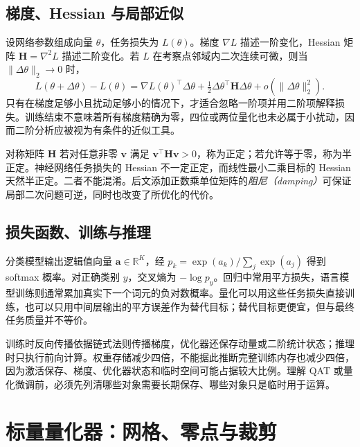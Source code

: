 \documentclass[UTF8,12pt,a4paper,fontset=fandol]{ctexart}
\begin{document}
\subsection{梯度、Hessian 与局部近似}
设网络参数组成向量 $\theta$，任务损失为 $L(\theta)$。梯度 $\nabla L$ 描述一阶变化，Hessian 矩阵 $\mathbf H=\nabla^2L$ 描述二阶变化。若 $L$ 在考察点邻域内二次连续可微，则当 $\|\Delta\theta\|_2\to0$ 时，
\begin{equation}
 L(\theta+\Delta\theta)-L(\theta)
 =\nabla L(\theta)^\top\Delta\theta
 +\tfrac12\Delta\theta^\top\mathbf H\Delta\theta
 +o(\|\Delta\theta\|_2^2).
 \label{eq:quant-taylor}
\end{equation}
只有在梯度足够小且扰动足够小的情况下，才适合忽略一阶项并用二阶项解释损失。训练结束不意味着所有梯度精确为零，四位或两位量化也未必属于小扰动，因而二阶分析应被视为有条件的近似工具。

对称矩阵 $\mathbf H$ 若对任意非零 $\mathbf v$ 满足 $\mathbf v^\top\mathbf H\mathbf v>0$，称为正定；若允许等于零，称为半正定。神经网络任务损失的 Hessian 不一定正定，而线性最小二乘目标的 Hessian 天然半正定。二者不能混淆。后文添加正数乘单位矩阵的\emph{阻尼（damping）}可保证局部二次问题可逆，同时也改变了所优化的代价。

\subsection{损失函数、训练与推理}
分类模型输出逻辑值向量 $\mathbf a\in\mathbb R^K$，经 $p_k=\exp(a_k)/\sum_j\exp(a_j)$ 得到 softmax 概率。对正确类别 $y$，交叉熵为 $-\log p_y$。回归中常用平方损失，语言模型训练则通常累加真实下一个词元的负对数概率。量化可以用这些任务损失直接训练，也可以只用中间层输出的平方误差作为替代目标；替代目标更便宜，但与最终任务质量并不等价。

训练时反向传播依据链式法则传播梯度，优化器还保存动量或二阶统计状态；推理时只执行前向计算。权重存储减少四倍，不能据此推断完整训练内存也减少四倍，因为激活保存、梯度、优化器状态和临时空间可能占据较大比例。理解 QAT 或量化微调前，必须先列清哪些对象需要长期保存、哪些对象只是临时用于运算。

\section{标量量化器：网格、零点与裁剪}
\label{sec:quant-scalar}
\end{document}
